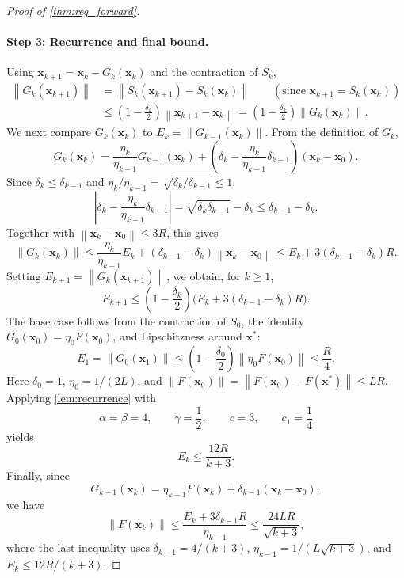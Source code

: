 \documentclass[10pt,a4paper]{amsart}
\newcommand{\norm}[1]{\left\| #1 \right\|}
\newcommand{\vect}[1]{\mathbf{#1}}
\begin{document}
\begin{proof}[Proof of \cref{thm:reg_forward}]
\paragraph{Step 3: Recurrence and final bound.}
Using \(\vect{x}_{k+1}=\vect{x}_k-G_k(\vect{x}_k)\) and the contraction of
\(S_k\),
\begin{align*}
    \norm{G_k(\vect{x}_{k+1})}
    &=
    \norm{S_k(\vect{x}_{k+1})-S_k(\vect{x}_k)}
    \qquad(\text{since }\vect{x}_{k+1}=S_k(\vect{x}_k)) \\
    &\le
    \left(1-\frac{\delta_k}{2}\right)\norm{\vect{x}_{k+1}-\vect{x}_k}
    =
    \left(1-\frac{\delta_k}{2}\right)\norm{G_k(\vect{x}_k)}.
\end{align*}
We next compare \(G_k(\vect{x}_k)\) to
\(E_k=\norm{G_{k-1}(\vect{x}_k)}\). From the definition of \(G_k\),
\[
    G_k(\vect{x}_k)
    =
    \frac{\eta_k}{\eta_{k-1}}G_{k-1}(\vect{x}_k)
    +
    \left(\delta_k-\frac{\eta_k}{\eta_{k-1}}\delta_{k-1}\right)
    (\vect{x}_k-\vect{x}_0).
\]
Since \(\delta_k\le\delta_{k-1}\) and
\(\eta_k/\eta_{k-1}=\sqrt{\delta_k/\delta_{k-1}}\le1\),
\[
    \left|\delta_k-\frac{\eta_k}{\eta_{k-1}}\delta_{k-1}\right|
    =
    \sqrt{\delta_k\delta_{k-1}}-\delta_k
    \le
    \delta_{k-1}-\delta_k.
\]
Together with \(\norm{\vect{x}_k-\vect{x}_0}\le3R\), this gives
\[
    \norm{G_k(\vect{x}_k)}
    \le
    \frac{\eta_k}{\eta_{k-1}}E_k
    +(\delta_{k-1}-\delta_k)\norm{\vect{x}_k-\vect{x}_0}
    \le
    E_k+3(\delta_{k-1}-\delta_k)R.
\]
Setting \(E_{k+1}=\norm{G_k(\vect{x}_{k+1})}\), we obtain, for \(k\ge1\),
\[
    E_{k+1}
    \le
    \left(1-\frac{\delta_k}{2}\right)
    \bigl(E_k+3(\delta_{k-1}-\delta_k)R\bigr).
\]
The base case follows from the contraction of \(S_0\), the identity
\(G_0(\vect{x}_0)=\eta_0F(\vect{x}_0)\), and Lipschitzness around
\(\vect{x}^*\):
\[
    E_1
    =
    \norm{G_0(\vect{x}_1)}
    \le
    \left(1-\frac{\delta_0}{2}\right)\norm{\eta_0F(\vect{x}_0)}
    \le
    \frac{R}{4}.
\]
Here \(\delta_0=1\), \(\eta_0=1/(2L)\), and
\(\norm{F(\vect{x}_0)}=\norm{F(\vect{x}_0)-F(\vect{x}^*)}\le LR\).
Applying \cref{lem:recurrence} with
\[
    \alpha=\beta=4,\qquad
    \gamma=\frac12,\qquad
    c=3,\qquad
    c_1=\frac14
\]
yields
\[
    E_k\le\frac{12R}{k+3}.
\]
Finally, since
\[
    G_{k-1}(\vect{x}_k)
    =
    \eta_{k-1}F(\vect{x}_k)
    +\delta_{k-1}(\vect{x}_k-\vect{x}_0),
\]
we have
\[
    \norm{F(\vect{x}_k)}
    \le
    \frac{E_k+3\delta_{k-1}R}{\eta_{k-1}}
    \le
    \frac{24LR}{\sqrt{k+3}},
\]
where the last inequality uses
\(\delta_{k-1}=4/(k+3)\), \(\eta_{k-1}=1/(L\sqrt{k+3})\), and
\(E_k\le12R/(k+3)\).
\end{proof}
\end{document}
